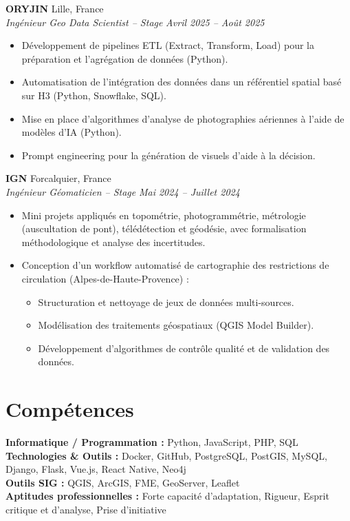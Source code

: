 \documentclass[11pt, a4paper]{article}
\newcommand{\cventry}[4]{
    \vspace{0.2cm}
    \noindent \textbf{#1} \hfill #2 \\
    \noindent \textit{#3} \hfill \textit{#4} \par
    \vspace{0.12cm}
}
\begin{document}
\cventry{ORYJIN}{Lille, France}{Ingénieur Geo Data Scientist -- Stage}{Avril 2025 -- Août 2025}
\begin{itemize}[leftmargin=0.5cm, nosep]
    \item Développement de pipelines ETL (Extract, Transform, Load) pour la préparation et l’agrégation de données (Python).
    \item Automatisation de l’intégration des données dans un référentiel spatial basé sur H3 (Python, Snowflake, SQL).
    \item Mise en place d’algorithmes d’analyse de photographies aériennes à l’aide de modèles d’IA (Python).
    \item Prompt engineering pour la génération de visuels d’aide à la décision.
\end{itemize}

\cventry{IGN}{Forcalquier, France}{Ingénieur Géomaticien -- Stage}{Mai 2024 -- Juillet 2024}
\begin{itemize}[leftmargin=0.5cm, nosep]
    \item Mini projets appliqués en topométrie, photogrammétrie, métrologie (auscultation de pont), télédétection et géodésie, avec formalisation méthodologique et analyse des incertitudes.
    \item Conception d’un workflow automatisé de cartographie des restrictions de circulation (Alpes-de-Haute-Provence) :
    \begin{itemize}[leftmargin=0.5cm, nosep]
        \item Structuration et nettoyage de jeux de données multi-sources.
        \item Modélisation des traitements géospatiaux (QGIS Model Builder).
        \item Développement d’algorithmes de contrôle qualité et de validation des données.
    \end{itemize}
\end{itemize}

\section*{Compétences}
\noindent \textbf{Informatique / Programmation :} Python, JavaScript, PHP, SQL \\
\textbf{Technologies \& Outils :} Docker, GitHub, PostgreSQL, PostGIS, MySQL, Django, Flask, Vue.js, React Native, Neo4j \\
\textbf{Outils SIG :} QGIS, ArcGIS, FME, GeoServer, Leaflet \\
\textbf{Aptitudes professionnelles :} Forte capacité d’adaptation, Rigueur, Esprit critique et d'analyse, Prise d’initiative
\end{document}
